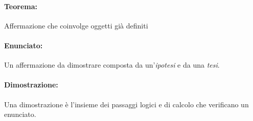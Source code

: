         \paragraph{Teorema:\\ }
            Affermazione che coinvolge oggetti già definiti
        \paragraph{Enunciato:\\ }
            Un affermazione  da dimostrare composta da un'\textit{ipotesi} e da una \textit{tesi}.
        \hfill \break
        \paragraph{Dimostrazione:\\ }
            Una dimostrazione è l'insieme dei passaggi logici e di calcolo che verificano un enunciato.
        